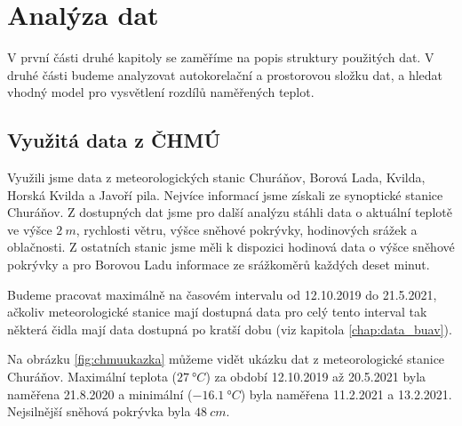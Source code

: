 \chapter{Analýza dat} \label{chap:analysis}
V první části druhé kapitoly se zaměříme na popis struktury použitých dat. V druhé části budeme analyzovat autokorelační a prostorovou složku dat, a hledat vhodný model pro vysvětlení rozdílů naměřených teplot.

\section{Využitá data z ČHMÚ}
Využili jsme data z meteorologických stanic Churáňov, Borová Lada, Kvilda, Horská Kvilda a Javoří pila. Nejvíce informací jsme získali ze synoptické stanice Churáňov. Z dostupných dat jsme pro další analýzu stáhli data o aktuální teplotě ve výšce $\SI{2}{m}$, rychlosti větru, výšce sněhové pokrývky, hodinových srážek a oblačnosti. Z ostatních stanic jsme měli k dispozici hodinová data o výšce sněhové pokrývky a pro Borovou Ladu informace ze srážkoměrů každých deset minut.

Budeme pracovat maximálně na časovém intervalu od 12.10.2019 do 21.5.2021, ačkoliv meteorologické stanice mají dostupná data pro celý tento interval tak některá čidla mají data dostupná po kratší dobu (viz kapitola \ref{chap:data_buav}).

Na obrázku \ref{fig:chmuukazka} můžeme vidět ukázku dat z meteorologické stanice Churáňov. Maximální teplota ($\SI{27}{\degree C}$) za období 12.10.2019 až 20.5.2021 byla naměřena 21.8.2020 a minimální ($\SI{-16.1}{\degree C}$) byla naměřena 11.2.2021 a 13.2.2021. Nejsilnější sněhová pokrývka byla $\SI{48}{cm}$.

